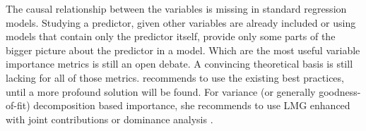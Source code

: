 \documentclass[11pt,a4paper,twoside]{book}
\begin{document}
The causal relationship between the variables is missing in standard regression models. Studying a predictor, given other variables are already included or using models that contain only  the predictor itself,  provide only some parts of the bigger picture about the predictor in a model. Which  are the most useful variable importance metrics is still an open debate. A convincing theoretical basis is still lacking for all of those metrics.  \cite{Gromping2015} recommends to use the existing best practices, until a more profound solution will be found. For variance (or generally goodness-of-fit) decomposition based importance, she recommends to use LMG enhanced with joint contributions or dominance analysis \citep{Gromping2015}.






 

\end{document}

